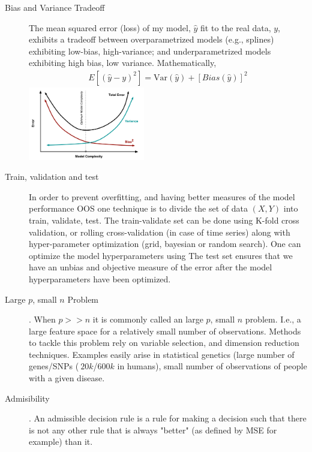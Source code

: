 \documentclass[10pt,landscape]{article}
\newcommand{\var}{\textrm{Var}}
\begin{document}
\begin{multicols*}{3}
\begin{description}
        \item[Bias and Variance Tradeoff]  The mean squared error (loss) of my model, $\hat{y}$ fit to the real data, $y$,
        exhibits a tradeoff between overparametrized models (e.g., splines) exhibiting low-bias, high-variance; and
        underparametrized models exhibiting high bias, low variance.  Mathematically,
               \begin{align*}
                E\left[ \left( \hat{y}-y \right)^2 \right] = \var(\hat{y}) + [Bias(\hat{y})]^2
               \end{align*}
        \includegraphics[width=2in]{figures/biasvariance.png}
        \item[Train, validation and test]  In order to prevent overfitting, and having better measures of the model performance OOS
        one technique is to divide the set of data $(X,Y)$ into train, validate, test.  The train-validate set can be done using
        K-fold cross validation, or rolling cross-validation (in case of time series) along with hyper-parameter optimization
        (grid, bayesian or random search).  One can optimize the model hyperparameters using
        The test set ensures that we have an unbias and objective measure of the error after the model
        hyperparameters have been optimized.

        \item[Large $p$, small $n$ Problem].  When $p >> n$ it is commonly
        called an large $p$, small $n$ problem. I.e., a large feature space for a relatively small
        number of observations.  Methods to tackle this problem rely on variable selection, and
        dimension reduction techniques.  Examples easily arise in statistical genetics
        (large number of genes/SNPs ($~20k$/$600k$ in humans),
        small number of observations of people with a given disease.

        \item[Admisibility]. An admissible decision rule is a rule for making a decision
        such that there is not any other rule that is always "better"
        (as defined by MSE for example) than it.

    \end{description}


\end{multicols*}
\end{document}
